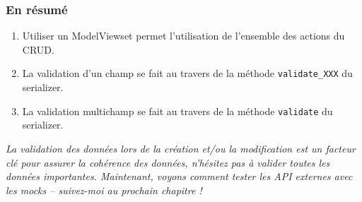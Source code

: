\documentclass[a4paper]{article}
\begin{document}
\subsubsection*{En résumé}
\begin{enumerate}
\item Utiliser un ModelViewset permet l’utilisation de l’ensemble des actions du CRUD.
\item La validation d’un champ se fait au travers de la méthode {\tt validate\_XXX}  du serializer.
\item La validation multichamp se fait au travers de la méthode {\tt validate}  du serializer.
\end{enumerate}
{\em La validation des données lors de la création et/ou la modification est un facteur clé pour assurer la cohérence des données, n’hésitez pas à valider toutes les données importantes. Maintenant, voyons comment tester les API externes avec les mocks – suivez-moi au prochain chapitre !}
\end{document}
